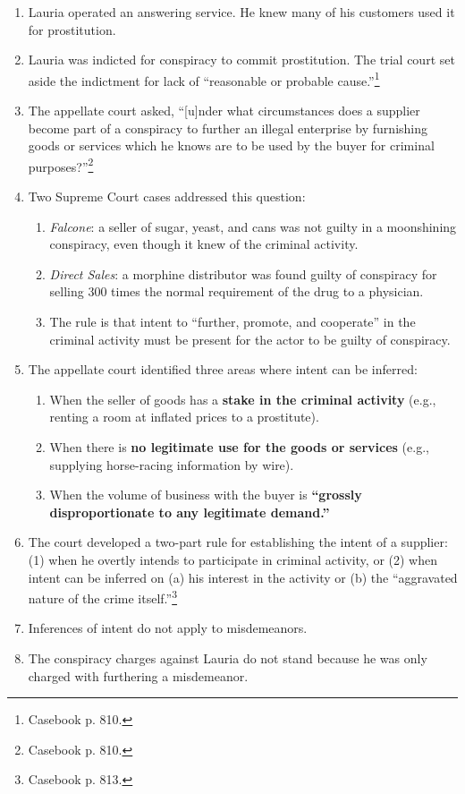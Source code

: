 \begin{enumerate}
    \item Lauria operated an answering service. He knew many of his customers 
    used it for prostitution.
    \item Lauria was indicted for conspiracy to commit prostitution. The trial 
    court set aside the indictment for lack of ``reasonable or probable 
    cause.''\footnote{Casebook p. 810.}
    \item The appellate court asked, ``[u]nder what circumstances does a 
    supplier become part of a conspiracy to further an illegal enterprise by 
    furnishing goods or services which he knows are to be used by the buyer 
    for criminal purposes?''\footnote{Casebook p. 810.}
    \item Two Supreme Court cases addressed this question:
    \begin{enumerate}
        \item \emph{Falcone}: a seller of sugar, yeast, and cans was not 
        guilty in a moonshining conspiracy, even though it knew of the 
        criminal activity.
        \item \emph{Direct Sales}: a morphine distributor was found guilty of 
        conspiracy for selling 300 times the normal requirement of the drug to 
        a physician.  \item The rule is that intent to ``further, promote, and 
        cooperate'' in the criminal activity must be present for the actor to 
        be guilty of conspiracy.
    \end{enumerate}
    \item The appellate court identified three areas where intent can be 
    inferred:
    \begin{enumerate}
        \item When the seller of goods has a \textbf{stake in the criminal 
        activity} (e.g., renting a room at inflated prices to a prostitute).
        \item When there is \textbf{no legitimate use for the goods or 
        services} (e.g., supplying horse-racing information by wire).
        \item When the volume of business with the buyer is \textbf{``grossly 
        disproportionate to any legitimate demand.''}
    \end{enumerate}
    \item The court developed a two-part rule for establishing the intent of a 
    supplier: (1) when he overtly intends to participate in criminal activity, 
    or (2) when intent can be inferred on (a) his interest in the activity or 
    (b) the ``aggravated nature of the crime itself.''\footnote{Casebook p. 
    813.}
    \item Inferences of intent do not apply to misdemeanors.
    \item The conspiracy charges against Lauria do not stand because he was 
    only charged with furthering a misdemeanor.
\end{enumerate}

